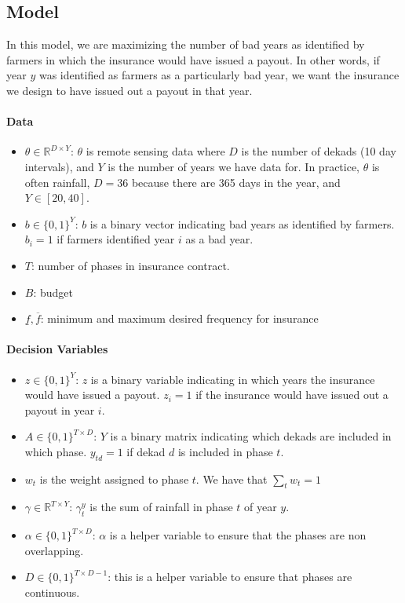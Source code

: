 \documentclass[11pt]{article}
\begin{document}
  \subsection{Model}
  In this model, we are maximizing the number of bad years as identified by farmers in which the insurance would have issued a payout. In other words, if year $y$ was identified as farmers as a particularly bad year, we want the insurance we design to have issued out a payout in that year.  

    \paragraph{Data}
      \begin{itemize}
        \item $\theta \in \mathbb{R}^{D \times Y}$: $\theta$ is remote sensing data where $D$ is the number of dekads (10 day intervals), and $Y$ is the number of years we have data for. In practice, $\theta$ is often rainfall, $D=36$ because there are 365 days in the year, and $Y\in [20,40]$.
        \item $b \in \{ 0,1\}^Y$: $b$ is a binary vector indicating bad years as identified by farmers. $b_i = 1$ if farmers identified year $i$ as a bad year. 
        \item $T$: number of phases in insurance contract. 
        \item $B$: budget 
        \item $\underline{f}, \overline{f}$: minimum and maximum desired frequency for insurance
      \end{itemize}

    \paragraph{Decision Variables}
      \begin{itemize}
        \item $z \in \{ 0,1\}^Y$: $z$ is a binary variable indicating in which years the insurance would have issued a payout. $z_i = 1$ if the insurance would have issued out a payout in year $i$. 
        \item $A \in \{ 0,1\}^{T \times D}$: $Y$ is a binary matrix indicating which dekads are included in which phase. $y_{td} = 1$ if dekad $d$ is included in phase $t$. 
        \item $w_t$ is the weight assigned to phase $t$. We have that $\sum_t w_t = 1$ 
        \item $\gamma \in \mathbb{R}^{T \times Y}$: $\gamma^y_t$ is the sum of rainfall in phase $t$ of year $y$. 
        \item $\alpha \in \{ 0,1\}^{T \times D}$: $\alpha$ is a helper variable to ensure that the phases are non overlapping.
        \item $D \in \{ 0,1\}^{T \times D-1}$: this is a helper variable to ensure that phases are continuous. 
      \end{itemize}
    
\end{document}
